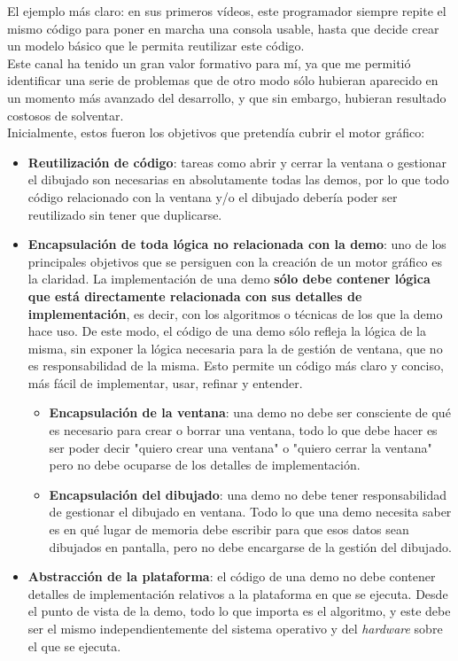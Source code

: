 El ejemplo más claro: en sus primeros vídeos, este programador siempre repite el mismo código para poner en marcha una consola usable, hasta que decide crear un modelo básico que le permita reutilizar este código.\\

Este canal ha tenido un gran valor formativo para mí, ya que me permitió identificar una serie de problemas que de otro modo sólo hubieran aparecido en un momento más avanzado del desarrollo, y que sin embargo, hubieran resultado costosos de solventar.\\

Inicialmente, estos fueron los objetivos que pretendía cubrir el motor gráfico:
\begin{itemize}
	\item \textbf{Reutilización de código}: tareas como abrir y cerrar la ventana o gestionar el dibujado son necesarias en absolutamente todas las demos, por lo que todo código relacionado con la ventana y/o el dibujado debería poder ser reutilizado sin tener que duplicarse.
	\item \textbf{Encapsulación de toda lógica no relacionada con la demo}: uno de los principales objetivos que se persiguen con la creación de un motor gráfico es la claridad. La implementación de una demo \textbf{sólo debe contener lógica que está directamente relacionada con sus detalles de implementación}, es decir, con los algoritmos o técnicas de los que la demo hace uso. De este modo, el código de una demo sólo refleja la lógica de la misma, sin exponer la lógica necesaria para la de gestión de ventana, que no es responsabilidad de la misma. Esto permite un código más claro y conciso, más fácil de implementar, usar, refinar y entender.
		\begin{itemize}
			\item \textbf{Encapsulación de la ventana}: una demo no debe ser consciente de qué es necesario para crear o borrar una ventana, todo lo que debe hacer es ser poder decir "quiero crear una ventana" o "quiero cerrar la ventana" pero no debe ocuparse de los detalles de implementación.
			\item \textbf{Encapsulación del dibujado}: una demo no debe tener responsabilidad de gestionar el dibujado en ventana. Todo lo que una demo necesita saber es en qué lugar de memoria debe escribir para que esos datos sean dibujados en pantalla, pero no debe encargarse de la gestión del dibujado.
		\end{itemize}
	\item \textbf{Abstracción de la plataforma}: el código de una demo no debe contener detalles de implementación relativos a la plataforma en que se ejecuta. Desde el punto de vista de la demo, todo lo que importa es el algoritmo, y este debe ser el mismo independientemente del sistema operativo y del \emph{hardware} sobre el que se ejecuta.
\end{itemize}

